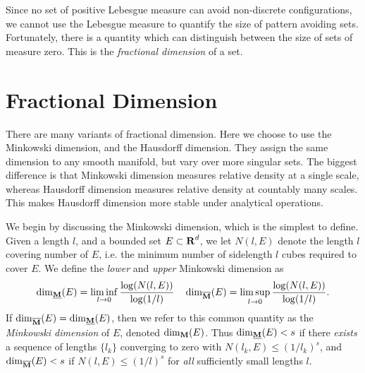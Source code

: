 Since no set of positive Lebesgue measure can avoid non-discrete configurations, we cannot use the Lebesgue measure to quantify the size of pattern avoiding sets. Fortunately, there is a quantity which can distinguish between the size of sets of measure zero. This is the \emph{fractional dimension} of a set.










\section{Fractional Dimension}

There are many variants of fractional dimension. Here we choose to use the Minkowski dimension, and the Hausdorff dimension. They assign the same dimension to any smooth manifold, but vary over more singular sets. The biggest difference is that Minkowski dimension measures relative density at a single scale, whereas Hausdorff dimension measures relative density at countably many scales. This makes Hausdorff dimension more stable under analytical operations.

We begin by discussing the Minkowski dimension, which is the simplest to define. Given a length $l$, and a bounded set $E \subset \operatorname{\mathbf{R}}^d$, we let $N(l,E)$ denote the length $l$ covering number of $E$, i.e. the minimum number of sidelength $l$ cubes required to cover $E$. We define the \emph{lower} and \emph{upper} Minkowski dimension as
%
\[ \operatorname{\dim_{\underline{\mathbf{M}}}}(E) = \liminf_{l \to 0} \frac{\log(N(l,E))}{\log(1/l)} \quad \operatorname{\dim_{\overline{\mathbf{M}}}}(E) = \limsup_{l \to 0} \frac{\log(N(l,E))}{\log(1/l)}. \]
%
If $\operatorname{\dim_{\overline{\mathbf{M}}}}(E) = \operatorname{\dim_{\underline{\mathbf{M}}}}(E)$, then we refer to this common quantity as the \emph{Minkowski dimension} of $E$, denoted $\operatorname{\dim_{\mathbf{M}}}(E)$. Thus $\operatorname{\dim_{\underline{\mathbf{M}}}}(E) < s$ if there {\it exists} a sequence of lengths $\{ l_k \}$ converging to zero with $N(l_k,E) \leq (1/l_k)^s$, and $\operatorname{\dim_{\overline{\mathbf{M}}}}(E) < s$ if $N(l,E) \leq (1/l)^s$ for \emph{all} sufficiently small lengths $l$.

